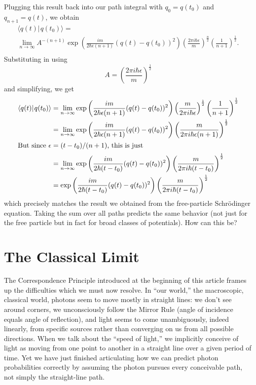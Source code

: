 \documentclass{amsart}
\newcommand{\ket}[1]{\vert \hspace{1pt}#1\rangle}
\newcommand{\braket}[2]{\langle #1 \ket{#2}}
\newcommand{\qv}{q}
\begin{document}
Plugging this result back into our path integral with $\qv_0 = \qv(t_0)$ and $\qv_{n+1} = \qv(t)$, we obtain
\begin{multline*}
\braket{\qv(t)}{\qv(t_0)} = \\
	\lim_{n\rightarrow\infty} A^{-(n+1)} \exp{\left( \frac{i m}{2 \hbar \epsilon (n+1)} (\qv(t) - \qv(t_0))^2 \right)} \left( \frac{2 \pi i \hbar \epsilon}{m}\right)^{\frac{n}{2}}\left(\frac{1}{n+1}\right)^{\frac{1}{2}}.\\
\end{multline*}
Substituting in using
\begin{equation*}
A = \left( \frac{2 \pi i \hbar \epsilon}{m} \right)^{\frac{1}{2}}
\end{equation*}
and simplifying, we get
\begin{align*}
\braket{\qv(t)}{\qv(t_0)}
	&= \lim_{n\rightarrow\infty} \exp{\left( \frac{i m}{2 \hbar \epsilon (n+1)} (\qv(t) - \qv(t_0))^2 \right)} \left( \frac{m}{2 \pi i \hbar \epsilon}\right)^{\frac{1}{2}} \left(\frac{1}{n+1}\right)^{\frac{1}{2}}\\
	&= \lim_{n\rightarrow\infty} \exp{\left( \frac{i m}{2 \hbar \epsilon (n+1)} (\qv(t) - \qv(t_0))^2 \right)} \left( \frac{m}{2 \pi i \hbar \epsilon (n+1)}\right)^{\frac{1}{2}}\\
\intertext{But since $\epsilon = (t - t_0)/(n+1)$, this is just}
	&= \lim_{n\rightarrow\infty} \exp{\left( \frac{i m}{2 \hbar (t-t_0)} (\qv(t) - \qv(t_0))^2 \right)} \left( \frac{m}{2 \pi i \hbar (t-t_0)}\right)^{\frac{1}{2}}\\
	&= \exp{\left( \frac{i m}{2 \hbar (t-t_0)} (\qv(t) - \qv(t_0))^2 \right)} \left( \frac{m}{2 \pi i \hbar (t-t_0)}\right)^{\frac{1}{2}}\\
\end{align*}
which precisely matches the result we obtained from the free-particle Schr\"odinger equation.  Taking the sum over all paths predicts the same behavior (not just for the free particle but in fact for broad classes of potentials).  How can this be?

\section{The Classical Limit}
The Correspondence Principle introduced at the beginning of this article frames up the difficulties which we must now resolve.  In ``our world,'' the macroscopic, classical world, photons seem to move mostly in straight lines: we don't see around corners, we unconsciously follow the Mirror Rule (angle of incidence equals angle of reflection), and light seems to come unambiguously, indeed linearly, from specific sources rather than converging on us from all possible directions.  When we talk about the ``speed of light,'' we implicitly conceive of light as moving from one point to another in a straight line over a given period of time.  Yet we have just finished articulating how we can predict photon probabilities correctly by assuming the photon pursues every conceivable path, not simply the straight-line path.
\end{document}

